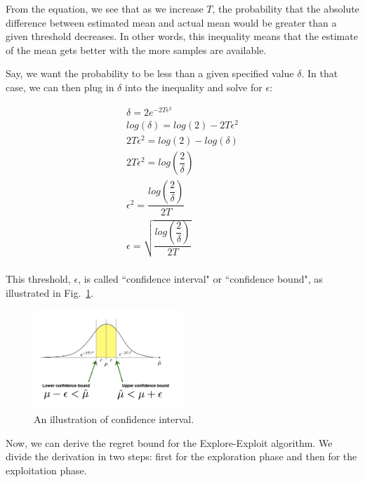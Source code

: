 \documentclass[11pt]{article}
\begin{document}
\normalfont

From the equation, we see that as we increase $T$, the probability that the absolute difference between estimated mean and actual mean would be greater than a given threshold decreases. In other words, this inequality means that the estimate of the mean gets better with the more samples are available. 





Say, we want the probability to be less than a given specified value $\delta$. In that case, we can then plug in $\delta$ into the inequality and solve for $\epsilon$:

\begin{align*}
    \delta = 2 e^{-2T\epsilon^2} \\
    log(\delta) = log(2) - 2T\epsilon^2 \\
     2T\epsilon^2 = log(2) - log(\delta) \\
     2T\epsilon^2 = log(\dfrac{2}{\delta}) \\
     \epsilon^2 = \dfrac{log(\dfrac{2}{\delta})}{2T} \\
     \epsilon = \sqrt{\dfrac{log(\dfrac{2}{\delta})}{2T}} \\
\end{align*}

This threshold, $\epsilon$, is called ``confidence interval" or ``confidence bound", as illustrated in Fig.~\ref{fig:confid}.
\begin{figure}[h!]
    \centering
    \includegraphics[width=0.5\textwidth]{figs/confidence_region.png}
    \caption{An illustration of confidence interval.}
    \label{fig:confid}
\end{figure}


Now, we can derive the regret bound for the Explore-Exploit algorithm. We divide the derivation in two steps: first for the exploration phase
and then for the exploitation phase.
\end{document}
